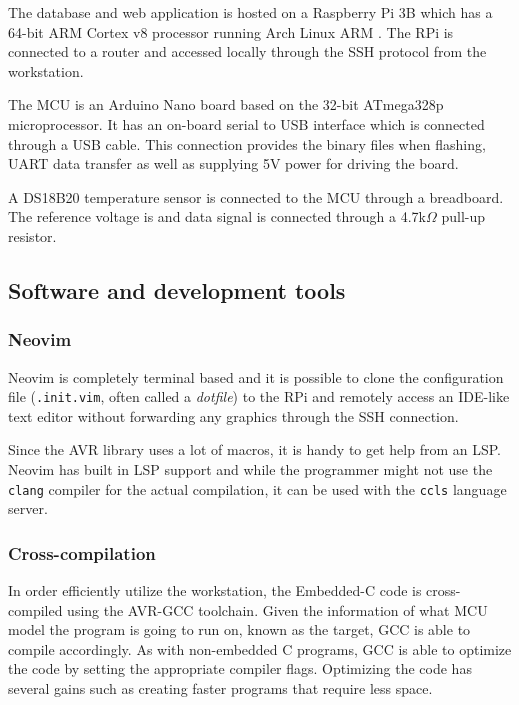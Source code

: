 The database and web application is hosted on a Raspberry Pi 3B which has a 64-bit ARM Cortex v8 processor running Arch Linux ARM \cite{RaspberryPiArch}. The RPi is connected to a router and accessed locally through the SSH protocol from the workstation.

The MCU is an Arduino Nano board based on the 32-bit ATmega328p microprocessor. It has an on-board serial to USB interface which is connected through a USB cable. This connection provides the binary files when flashing, UART data transfer as well as supplying 5V power for driving the board.

A DS18B20 temperature sensor is connected to the MCU through a breadboard. The reference voltage is and data signal is connected through a 4.7k$\Omega$ pull-up resistor.

\subsection{Software and development tools}%
\label{sub:software_and_development_tools}
\subsubsection{Neovim}%
\label{ssub:neovim}
Neovim is completely terminal based and it is possible to clone the configuration file (\verb|.init.vim|, often called a \textit{dotfile}) to the RPi and remotely access an IDE-like text editor without forwarding any graphics through the SSH connection.

Since the AVR library uses a lot of macros, it is handy to get help from an LSP. Neovim has built in LSP support and while the programmer might not use the \verb|clang| compiler for the actual compilation, it can be used with the \verb|ccls| language server.



\subsubsection{Cross-compilation}%
\label{ssub:cross_compilation}
In order efficiently utilize the workstation, the Embedded-C code is cross-compiled using the AVR-GCC toolchain. Given the information of what MCU model the program is going to run on, known as the target, GCC is able to compile accordingly. As with non-embedded C programs, GCC is able to optimize the code by setting the appropriate compiler flags. Optimizing the code has several gains such as creating faster programs that require less space.

